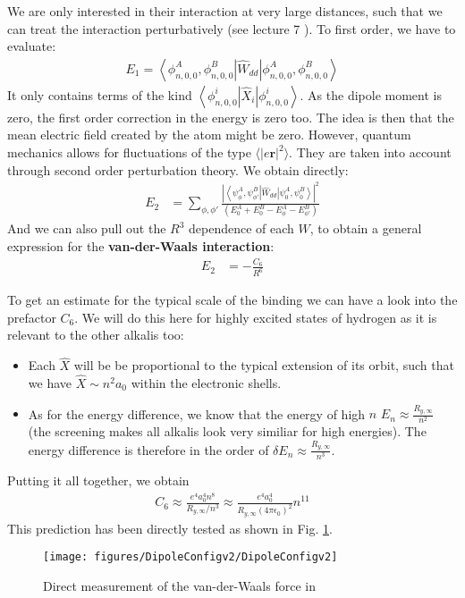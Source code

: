 \documentclass[10pt]{article}
\let\cite\citep
\providecommand\citep{\cite}
\newcommand{\bra}[1]{\ensuremath{\left\langle#1\right|}}
\newcommand{\ket}[1]{\ensuremath{\left|#1\right\rangle}}
\begin{document}
We are only interested in their interaction at very large distances, such that we can treat the interaction perturbatively (see lecture 7 \cite{Jendrzejewskia}). To first order, we have to evaluate:
\begin{align}
E_1 = \bra{\phi_{n,0,0}^A, \phi_{n,0,0}^B} \hat{W}_{dd} 
\ket{\phi_{n,0,0}^A, \phi_{n,0,0}^B} 
\end{align}
It only contains terms of the kind $\bra{\phi_{n,0,0}^i} \hat{X}_i \ket{\phi_{n,0,0}^i} $. As the dipole moment is zero, the first order correction in the energy is zero too. The idea is then that the mean electric field created by the atom might be zero. However, quantum mechanics allows for fluctuations of the type $\langle |e\mathbf{r}|^2\rangle$. They are taken into account through second order perturbation theory. We obtain directly: 
\begin{align}
E_2 &= \sum_{\phi,\phi'} \frac{|\bra{\psi_{\phi}^A,\psi_{\phi'}^B}\hat{W}_{dd}\ket{\psi_{0}^A,\psi_{0}^B}|^2}{(E_{0}^A+E_0^B -E_\phi^A -E_{\phi'}^B)}
\end{align}
And we can also pull out the $R^3$ dependence of each $W$, to obtain a general expression for the \textbf{van-der-Waals interaction}:
\begin{align}
E_2 &= - \frac{C_6}{R^6}
\end{align}

To get an estimate for the typical scale of the binding we can have a look into the prefactor $C_6$. We will do this here for highly excited states of hydrogen as it is relevant to the other alkalis too:
\begin{itemize}
\item Each $\hat{X}$ will be be proportional to the typical extension of its orbit, such that we have $\hat{X} \sim n^2 a_0 $ within the electronic shells.
\item As for the energy difference, we know that the energy of high $n$ $E_n \approx \frac{ R_{y,\infty}}{n^2}$ (the screening makes all alkalis look very similiar for high energies). The energy difference is therefore in the order of $\delta E_n \approx \frac{ R_{y,\infty}}{n^3}$.
\end{itemize} 
 Putting it all together, we obtain
\begin{align}
C_6 \approx \frac{e^4 a_0^4 n^8}{R_{y,\infty}/n^3} \approx \frac{e^4 a_0^4}{R_{y,\infty} (4\pi\epsilon_0)^2} n^{11}
\end{align}
This prediction has been directly tested as shown in Fig. \ref{681790}.
\begin{figure}[h!]
\begin{center}
\texttt{[image: figures/DipoleConfigv2/DipoleConfigv2]}
\caption{{Direct measurement of the van-der-Waals force in \protect\cite{B_guin_2013}
{\label{681790}}%
}}
\end{center}
\end{figure}
\end{document}
